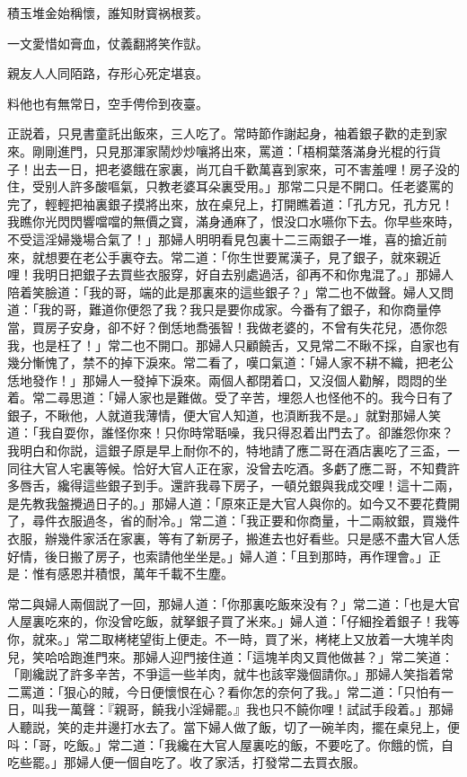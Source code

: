 \begin{myquote}
積玉堆金始稱懷，誰知財寳祸根荄。

一文愛惜如膏血，仗義翻將笑作獃。

親友人人同陌路，存形心死定堪哀。

料他也有無常日，空手俜伶到夜臺。
\end{myquote}

正説着，只見書童託出飯來，三人吃了。常時節作謝起身，袖着銀子歡的走到家來。剛剛進門，只見那渾家鬧炒炒嚷將出來，罵道：「梧桐葉落滿身光棍的行貨子！出去一日，把老婆餓在家裏，尚兀自千歡萬喜到家來，可不害羞哩！房子没的住，受别人許多酸嘔氣，只教老婆耳朵裏受用。」那常二只是不開口。任老婆罵的完了，輕輕把袖裏銀子摸將出來，放在桌兒上，打開瞧着道：「孔方兄，孔方兄！我瞧你光閃閃響噹噹的無價之寳，滿身通麻了，恨没口水嚥你下去。你早些來時，不受這淫婦幾場合氣了！」那婦人明明看見包裏十二三兩銀子一堆，喜的搶近前來，就想要在老公手裏夺去。常二道：「你生世要駡漢子，見了銀子，就來親近哩！我明日把銀子去買些衣服穿，好自去别處過活，卻再不和你鬼混了。」那婦人陪着笑臉道：「我的哥，端的此是那裏來的這些銀子？」常二也不做聲。婦人又問道：「我的哥，難道你便怨了我？我只是要你成家。今番有了銀子，和你商量停當，買房子安身，卻不好？倒恁地喬張智！我做老婆的，不曾有失花兒，憑你怨我，也是枉了！」常二也不開口。那婦人只顧饒舌，又見常二不瞅不採，自家也有幾分慚愧了，禁不的掉下淚來。常二看了，嘆口氣道：「婦人家不耕不織，把老公恁地發作！」那婦人一發掉下淚來。兩個人都閉着口，又沒個人勸解，悶悶的坐着。常二尋思道：「婦人家也是難做。受了辛苦，埋怨人也怪他不的。我今日有了銀子，不瞅他，人就道我薄情，便大官人知道，也湏断我不是。」就對那婦人笑道：「我自耍你，誰怪你來！只你時常聒噪，我只得忍着出門去了。卻誰怨你來？我明白和你説，這銀子原是早上耐你不的，特地請了應二哥在酒店裏吃了三盃，一同往大官人宅裏等候。恰好大官人正在家，没曾去吃酒。多虧了應二哥，不知費許多唇舌，纔得這些銀子到手。還許我尋下房子，一頓兑銀與我成交哩！這十二兩，是先教我盤攪過日子的。」那婦人道：「原來正是大官人與你的。如今又不要花費開了，尋件衣服過冬，省的耐冷。」常二道：「我正要和你商量，十二兩紋銀，買幾件衣服，辦幾件家活在家裏，等有了新房子，搬進去也好看些。只是感不盡大官人恁好情，後日搬了房子，也索請他坐坐是。」婦人道：「且到那時，再作理會。」正是：惟有感恩并積恨，萬年千載不生塵。

常二與婦人兩個説了一回，那婦人道：「你那裏吃飯來没有？」常二道：「也是大官人屋裏吃來的，你没曾吃飯，就拏銀子買了米來。」婦人道：「仔細拴着銀子！我等你，就來。」常二取栲栳望街上便走。不一時，買了米，栲栳上又放着一大塊羊肉兒，笑哈哈跑進門來。那婦人迎門接住道：「這塊羊肉又買他做甚？」常二笑道：「剛纔説了許多辛苦，不爭這一些羊肉，就牛也該宰幾個請你。」那婦人笑指着常二罵道：「狠心的賊，今日便懷恨在心？看你怎的奈何了我。」常二道：「只怕有一日，叫我一萬聲：『親哥，饒我小淫婦罷。』我也只不饒你哩！試試手段着。」那婦人聽説，笑的走井邊打水去了。當下婦人做了飯，切了一碗羊肉，擺在桌兒上，便呌：「哥，吃飯。」常二道：「我纔在大官人屋裏吃的飯，不要吃了。你餓的慌，自吃些罷。」那婦人便一個自吃了。收了家活，打發常二去買衣服。

